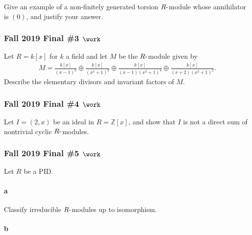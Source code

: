 Give an example of a non-finitely generated torsion
\(R{\hbox{-}}\)module whose annihilator is \((0)\), and justify your
answer.

\hypertarget{fall-2019-final-3-work}{%
\subsubsection{\texorpdfstring{Fall 2019 Final \#3
\(\work\)}{Fall 2019 Final \#3 \textbackslash work}}\label{fall-2019-final-3-work}}

Let \(R = k[x]\) for \(k\) a field and let \(M\) be the
\(R{\hbox{-}}\)module given by
\begin{align*}
M=\frac{k[x]}{(x-1)^{3}} \oplus \frac{k[x]}{\left(x^{2}+1\right)^{2}} \oplus \frac{k[x]}{(x-1)\left(x^{2}+1\right)^{4}} \oplus \frac{k[x]}{(x+2)\left(x^{2}+1\right)^{2}}
.\end{align*}
Describe the elementary divisors and invariant factors of \(M\).

\hypertarget{fall-2019-final-4-work}{%
\subsubsection{\texorpdfstring{Fall 2019 Final \#4
\(\work\)}{Fall 2019 Final \#4 \textbackslash work}}\label{fall-2019-final-4-work}}

Let \(I = (2, x)\) be an ideal in \(R = {\mathbb{Z}}[x]\), and show that
\(I\) is not a direct sum of nontrivial cyclic \(R{\hbox{-}}\)modules.

\hypertarget{fall-2019-final-5-work}{%
\subsubsection{\texorpdfstring{Fall 2019 Final \#5
\(\work\)}{Fall 2019 Final \#5 \textbackslash work}}\label{fall-2019-final-5-work}}

Let \(R\) be a PID.

\hypertarget{a-95}{%
\paragraph{a}\label{a-95}}

Classify irreducible \(R{\hbox{-}}\)modules up to isomorphism.

\hypertarget{b-85}{%
\paragraph{b}\label{b-85}}

